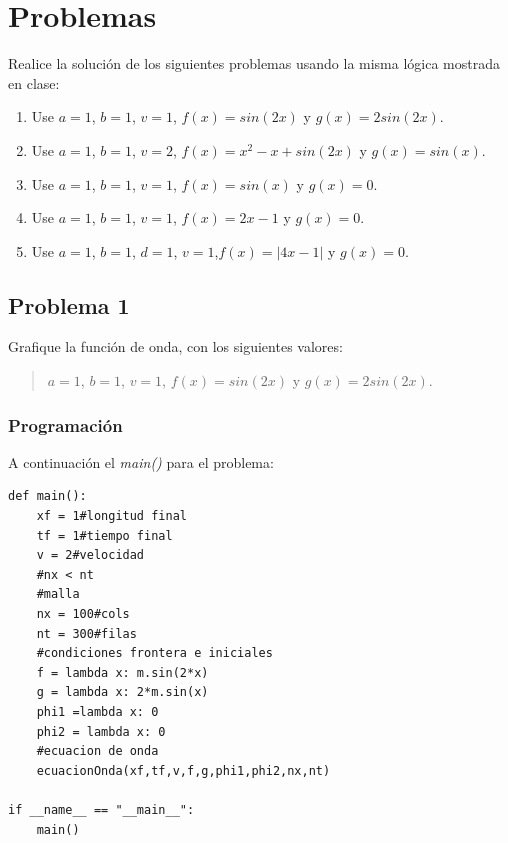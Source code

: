 \documentclass[a4paper,12pt]{article}
\newcommand{\eq}[1]{$#1$}
\begin{document}
    \section{Problemas}
    Realice la solución de los siguientes problemas usando la 
    misma lógica mostrada en clase:
    \begin{enumerate}
        \item Use \eq{a = 1}, \eq{b = 1}, \eq{v = 1}, \eq{f(x) = sin(2x)} y \eq{g(x) = 2sin(2x)}.
        \item Use \eq{a = 1}, \eq{b = 1}, \eq{v = 2}, \eq{f(x) = x^2 - x + sin(2x)} y \eq{g(x) = sin(x)}.
        \item Use \eq{a = 1}, \eq{b = 1}, \eq{v = 1}, \eq{f(x) = sin(x)} y \eq{g(x) = 0}.
        \item Use \eq{a = 1}, \eq{b = 1}, \eq{v = 1}, \eq{f(x) = 2x - 1} y \eq{g(x) = 0}.
        \item Use \eq{a = 1}, \eq{b = 1}, \eq{d = 1}, \eq{v = 1},\eq{f(x) = |4x - 1|} y \eq{g(x) = 0}.
    \end{enumerate}
    \subsection{Problema 1}
    Grafique la función de onda, con los siguientes valores:
    \begin{quote}
        \centering
        \eq{a = 1}, \eq{b = 1}, \eq{v = 1}, \eq{f(x) = sin(2x)} y \eq{g(x) = 2sin(2x)}.
    \end{quote}
    \subsubsection{Programación}
    A continuación el \emph{main()} para el problema:
\begin{lstlisting}[frame=single]
def main():
    xf = 1#longitud final
    tf = 1#tiempo final
    v = 2#velocidad 
    #nx < nt
    #malla
    nx = 100#cols
    nt = 300#filas
    #condiciones frontera e iniciales
    f = lambda x: m.sin(2*x)
    g = lambda x: 2*m.sin(x)
    phi1 =lambda x: 0
    phi2 = lambda x: 0
    #ecuacion de onda
    ecuacionOnda(xf,tf,v,f,g,phi1,phi2,nx,nt)

if __name__ == "__main__":
    main()
\end{lstlisting}
\end{document}
